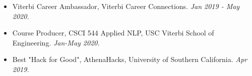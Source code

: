\documentclass[letterpaper,10pt]{article}
\newcommand{\activity}[2]{
    \item #1 \emph{#2}
}
\newcommand{\bulletsBegin}{
    \vspace{1pt}
    \begin{minipage}{17.6cm}
    \begin{itemize}[leftmargin=0.6cm]
    \setlength\itemsep{-0.1em}
}
\newcommand{\bulletsEnd}{
    \end{itemize}\vspace{0pt}
    \end{minipage}
}
\begin{document}
    \bulletsBegin
        \activity{Viterbi Career Ambassador, Viterbi Career Connections.}
        {Jan 2019 - May 2020.}
        \vspace{-3pt}
        \activity{Course Producer, CSCI 544 Applied NLP, USC Viterbi School of Engineering.}
        {Jan-May 2020.}
        \vspace{-3pt}
        \activity{Best "Hack for Good", AthenaHacks, University of Southern California.}
        {Apr 2019.}
        \vspace{-2pt}
    \bulletsEnd

\end{document}

